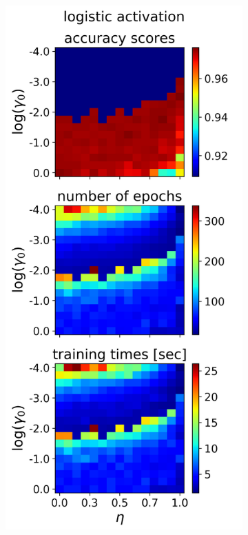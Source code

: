 \documentclass[nofootinbib,reprint,english]{revtex4-1}
\begin{document}
\begin{figure}[h!]
\centering
	\begin{subfigure}{0.32\textwidth}
	\centering
	\includegraphics[scale=0.38]{../results/NN/img/gridsearch2_logistic3.png}

\end{subfigure}
\end{figure}
\end{document}
